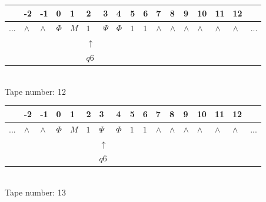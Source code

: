 \documentclass[11pt]{article}
\begin{document}
\begin{table}[H]
\centering
\begin{tabular}{lllllllllllllllll}
 & -2 & -1 & 0 & 1 & 2 & 3 & 4 & 5 & 6 & 7 & 8 & 9 & 10 & 11 & 12 & \\
\hline
$...$ & \multicolumn{1}{|l|}{$\wedge$} & \multicolumn{1}{|l|}{$\wedge$} & \multicolumn{1}{|l|}{$\Phi$} & \multicolumn{1}{|l|}{$M$} & \multicolumn{1}{|l|}{$1$} & \multicolumn{1}{|l|}{$\Psi$} & \multicolumn{1}{|l|}{$\Phi$} & \multicolumn{1}{|l|}{$1$} & \multicolumn{1}{|l|}{$1$} & \multicolumn{1}{|l|}{$\wedge$} & \multicolumn{1}{|l|}{$\wedge$} & \multicolumn{1}{|l|}{$\wedge$} & \multicolumn{1}{|l|}{$\wedge$} & \multicolumn{1}{|l|}{$\wedge$} & \multicolumn{1}{|l|}{$\wedge$} & $...$\\
\hline
&  &  &  &  & $\uparrow$ &  &  &  &  &  &  &  &  &  &  &  \\
&  &  &  &  & $ q6 $ &  &  &  &  &  &  &  &  &  &  &  \\
\end{tabular}
\\
Tape number: 12
\noindent\makebox[\linewidth]{\hdashrule{\textwidth}{1pt}{1pt}}\end{table}

\begin{table}[H]
\centering
\begin{tabular}{lllllllllllllllll}
 & -2 & -1 & 0 & 1 & 2 & 3 & 4 & 5 & 6 & 7 & 8 & 9 & 10 & 11 & 12 & \\
\hline
$...$ & \multicolumn{1}{|l|}{$\wedge$} & \multicolumn{1}{|l|}{$\wedge$} & \multicolumn{1}{|l|}{$\Phi$} & \multicolumn{1}{|l|}{$M$} & \multicolumn{1}{|l|}{$1$} & \multicolumn{1}{|l|}{$\Psi$} & \multicolumn{1}{|l|}{$\Phi$} & \multicolumn{1}{|l|}{$1$} & \multicolumn{1}{|l|}{$1$} & \multicolumn{1}{|l|}{$\wedge$} & \multicolumn{1}{|l|}{$\wedge$} & \multicolumn{1}{|l|}{$\wedge$} & \multicolumn{1}{|l|}{$\wedge$} & \multicolumn{1}{|l|}{$\wedge$} & \multicolumn{1}{|l|}{$\wedge$} & $...$\\
\hline
&  &  &  &  &  & $\uparrow$ &  &  &  &  &  &  &  &  &  &  \\
&  &  &  &  &  & $ q6 $ &  &  &  &  &  &  &  &  &  &  \\
\end{tabular}
\\
Tape number: 13
\noindent\makebox[\linewidth]{\hdashrule{\textwidth}{1pt}{1pt}}\end{table}
\end{document}
